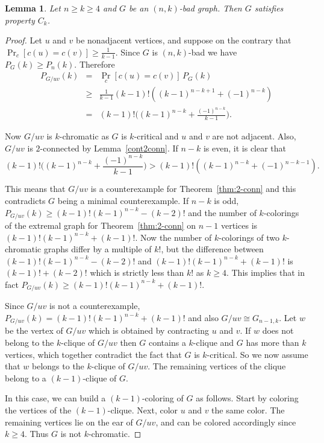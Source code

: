 \documentclass[11pt]{article}
\theoremstyle{plain}
\newtheorem{lemma}[theorem]{Lemma}
\theoremstyle{definition}
\theoremstyle{remark}
\begin{document}
\begin{lemma}\label{2conn_contr_prob}
Let $n\geq k\geq 4$ and $G$ be an $(n,k)$-bad graph. Then $G$ satisfies property $C_k$.
\end{lemma}
\begin{proof}
Let $u$ and $v$ be nonadjacent vertices, and suppose on the contrary that $\Pr_{c}[c(u)=c(v)]\geq \frac{1}{k-1}$. Since $G$ is $(n,k)$-bad we have $P_G(k)\geq P_n(k)$.  Therefore 
\begin{eqnarray*}
P_{G/uv}(k) & =&  \Pr_c[c(u)=c(v)]\, P_G(k) \\
&\geq & \frac{1}{k-1} (k-1)!((k-1)^{n-k+1}+(-1)^{n-k}) \\
&=& (k-1)!\Big((k-1)^{n-k}+\frac{(-1)^{n-k}}{k-1}\Big).
\end{eqnarray*}

Now $G/uv$ is $k$-chromatic as $G$ is $k$-critical and $u$ and $v$ are not adjacent. Also, $G/uv$ is $2$-connected by Lemma~\ref{cont2conn}. If $n-k$ is even, it is clear that 
\[
(k-1)!\Big((k-1)^{n-k}+\frac{(-1)^{n-k}}{k-1}\Big) > (k-1)!((k-1)^{n-k}+(-1)^{n-k-1}).
\]

This means that $G/uv$ is a counterexample for Theorem~\ref{thm:2-conn} and this contradicts $G$ being a minimal counterexample. If $n-k$ is odd, $P_{G/uv}(k)\geq (k-1)!(k-1)^{n-k}-(k-2)!$ and the number of $k$-colorings of the extremal graph for Theorem~\ref{thm:2-conn} on $n-1$ vertices is $(k-1)!(k-1)^{n-k}+(k-1)!$. Now the number of $k$-colorings of two $k$-chromatic graphs differ by a multiple of $k!$, but the difference between $(k-1)!(k-1)^{n-k}-(k-2)!$ and $(k-1)!(k-1)^{n-k}+(k-1)!$ is $(k-1)!+(k-2)!$ which is strictly less than $k!$ as $k \geq 4$. This implies that in fact $P_{G/uv}(k)\geq (k-1)!(k-1)^{n-k}+(k-1)!$. 

Since $G/uv$ is not a counterexample,  $P_{G/uv}(k)= (k-1)!(k-1)^{n-k}+(k-1)!$ and also $G/uv\cong G_{n-1, k}$. Let $w$ be the vertex of $G/uv$ which is obtained by contracting $u$ and $v$. If $w$ does not belong to the $k$-clique of $G/uv$ then $G$ contains a $k$-clique and $G$ has more than $k$ vertices, which together contradict the fact that $G$ is $k$-critical.  So we now assume that $w$ belongs to the $k$-clique of $G/uv$. The remaining vertices of the clique belong to a $(k-1)$-clique of $G$.

In this case, we can build a $(k-1)$-coloring of $G$ as follows. Start by coloring the vertices of the $(k-1)$-clique. Next, color $u$ and $v$ the same color. The remaining vertices lie on the ear of $G/uv$, and can be colored accordingly since $k\ge 4$. Thus $G$ is not $k$-chromatic.
\end{proof}
\end{document}
